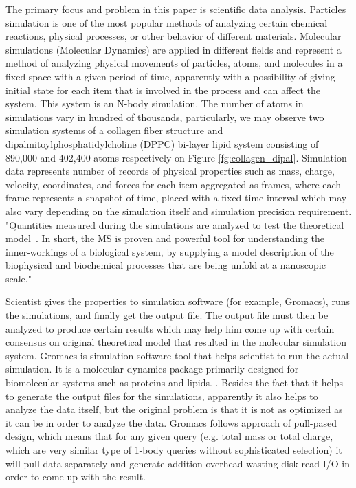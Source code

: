 \documentclass[10pt,journal,final,letterpaper,twocolumn]{IEEEtran}
\begin{document}
The primary focus and problem in this paper is scientific data analysis. Particles simulation is one of the most popular methods of analyzing certain chemical reactions, physical processes, or other behavior of different materials.
Molecular simulations (Molecular Dynamics) are applied in different fields and represent a method of analyzing physical movements of particles, atoms, and molecules in a fixed space with a given period of time, apparently with a possibility of giving initial state for each item that is involved in the process and can affect the system. This system is an N-body simulation. The number of atoms in simulations vary in hundred of thousands, particularly, we may observe two simulation systems of a collagen fiber structure and dipalmitoylphosphatidylcholine (DPPC) bi-layer lipid system consisting of 890,000 and 402,400 atoms respectively on Figure \ref{fg:collagen_dipal}. Simulation data represents number of records of physical properties such as mass, charge, velocity, coordinates, and forces for each item aggregated as frames, where each frame represents a snapshot of time, placed with a fixed time interval which may also vary depending on the simulation itself and simulation precision requirement. "Quantities measured during the simulations are analyzed to test the theoretical
model~\cite{Frenkel:api01,Landau:cup05}. In short, the MS is proven
and powerful tool for understanding the inner-workings of a
biological system, by supplying a model description of the
biophysical and biochemical processes that are being unfold at a
nanoscopic scale." \cite{mainPaper}

Scientist gives the properties to simulation software (for example, Gromacs), runs the simulations, and finally get the output file. The output file must then be analyzed to produce certain results which may help him come up with certain consensus on original theoretical model that resulted in the molecular simulation system\cite{Frenkel:api01}. Gromacs is simulation software tool that helps scientist to run the actual simulation. It is a molecular dynamics package primarily designed for biomolecular systems such as proteins and lipids. \cite{Gromacs-online}. Besides the fact that it helps to generate the output files for the simulations, apparently it also helps to analyze the data itself, but the original problem is that it is not as optimized as it can be in order to analyze the data. Gromacs follows approach of pull-pased design, which means that for any given query (e.g. total mass or total charge, which are very similar type of 1-body queries without sophisticated selection) it will pull data separately and generate addition overhead wasting disk read I/O in order to come up with the result.
\end{document}
